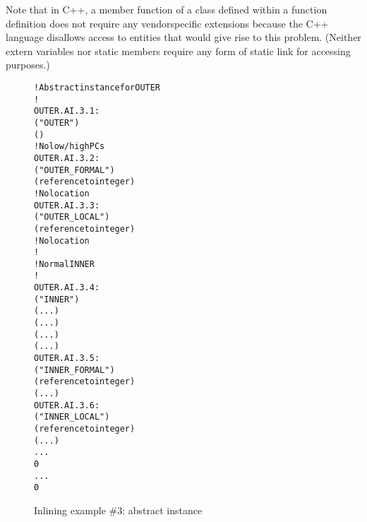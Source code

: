 Note that in C++, a member function of a class defined within
a function definition does not require any vendor\dash specific
extensions because the C++ language disallows access to
entities that would give rise to this problem. (Neither extern
variables nor static members require any form of static link
for accessing purposes.)

\begin{figure}[t]
\begin{dwflisting}
\begin{alltt}
    ! Abstract instance for OUTER
    ! 
OUTER.AI.3.1:
        ("OUTER")
        ()
        ! No low/high PCs
OUTER.AI.3.2:
            ("OUTER\_FORMAL")
            (reference to integer)
            ! No location
OUTER.AI.3.3:
            ("OUTER\_LOCAL")
            (reference to integer)
            ! No location
        !
        ! Normal INNER
        !
OUTER.AI.3.4:
            ("INNER")
            (...)
            (...)
            (...)
            (...)
OUTER.AI.3.5:
                ("INNER\_FORMAL")
                (reference to integer)
                (...)
OUTER.AI.3.6:
                ("INNER\_LOCAL")
                (reference to integer)
                (...)
            ...
            0
        ...
        0
\end{alltt}
\end{dwflisting}
\caption{Inlining example \#3: abstract instance}
\label{fig:inliningexample3abstractinstance}
\end{figure}

